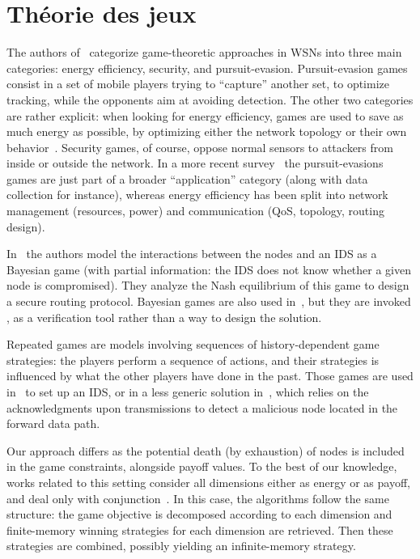 \section{Théorie des jeux}




The authors of~\cite{MT08} categorize game-theoretic approaches in WSNs into three main categories: energy efficiency, security, and pursuit-evasion.
Pursuit-evasion games consist in a set of mobile players trying to “capture” another set, to optimize tracking, while the opponents aim at avoiding detection.
The other two categories are rather explicit: when looking for energy efficiency, games are used to save as much energy as possible, by optimizing either the network topology or their own behavior~\cite{CPF09}.
Security games, of course, oppose normal sensors to attackers from inside or outside the network.
In a more recent survey~\cite{SWKC12} the pursuit-evasions games are just part of a broader “application” category (along with data collection for instance), whereas energy efficiency has been split into network management (resources, power) and communication (QoS, topology, routing design).

In~\cite{MMZ09} the authors model the interactions between the nodes and an IDS as a Bayesian game (\ie with partial information: the IDS does not know \apriori whether a given node is compromised).
They analyze the Nash equilibrium of this game to design a secure routing protocol.
Bayesian games are also used in~\cite{Ham12}, but they are invoked \aposteriori, as a verification tool rather than a way to design the solution.

Repeated games are models involving sequences of history-dependent game strategies: the players perform a sequence of actions, and their strategies is influenced by what the other players have done in the past.
Those games are used in~\cite{AD07} to set up an IDS, or in a less generic solution in~\cite{Red09}, which relies on the acknowledgments upon transmissions to detect a malicious node located in the forward data path.

Our approach differs as the potential death (by exhaustion) of nodes is included in the game constraints, alongside payoff values.
To the best of our knowledge, works related to this setting consider all dimensions either as energy or as payoff, and deal only with conjunction~\cite{chatterjee12,velner12a}.
In this case, the algorithms follow the same structure: the game objective is decomposed according to each dimension and finite-memory winning strategies for each dimension are retrieved.
Then these strategies are combined, possibly yielding an infinite-memory strategy.

